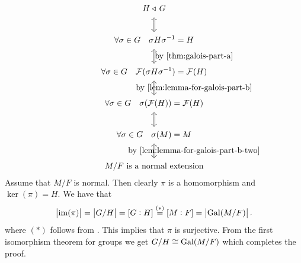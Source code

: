 \documentclass[11pt,a4paper]{article}
\begin{document}
\begin{proofof}{}
  \begin{gather*}
    H \normalin G \\
    \viff \\
    \forall \sigma \in G \quad \sigma H \sigma^{-1} = H \\
    \viff \mathclap{\hspace{3cm} \text{ by \Cref{thm:galois-part-a}}} \\
    \forall \sigma \in G \quad \FF(\sigma H \sigma^{-1}) = \FF(H) \\
    \viff \mathclap{\hspace{3cm} \text{ by \Cref{lem:lemma-for-galois-part-b}}} \\
    \forall \sigma \in G \quad \sigma(\FF(H)) = \FF(H) \\
    \viff \\
    \forall \sigma \in G \quad \sigma(M) = M \\
    \viff \mathclap{\hspace{3cm} \text{ by \Cref{lem:lemma-for-galois-part-b-two}}} \\
    M/F \text{ is a normal extension}
  \end{gather*}
  Assume that $M/F$ is normal.
  Then clearly $\pi$ is a homomorphism and $\ker(\pi) = H$.
  We have that
  \[
    \left\lvert\operatorname{im}(\pi)\right\rvert =
    \left\lvert G / H\right\rvert =
    [G : H] \overset{(*)}{=}
    [M : F] =
    \left\lvert\operatorname{Gal}(M / F)\right\rvert.
  \]
  where $(*)$ follows from .
  This implies that $\pi$ is surjective.
  From the first isomorphism theorem for groups we get
  $G/H \cong \operatorname{Gal}(M/F)$ which completes the proof.
\end{proofof}
\end{document}
